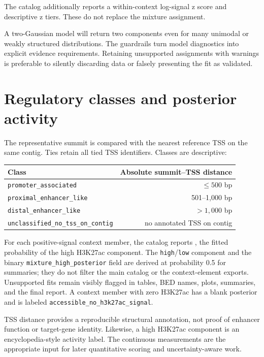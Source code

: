 \documentclass[11pt]{article}
\newcommand{\filep}[1]{\path{#1}}
\begin{document}
The catalog additionally reports a within-context log-signal z score and
descriptive z tiers.  These do not replace the mixture assignment.

A two-Gaussian model will return two components even for many unimodal or
weakly structured distributions.  The guardrails turn model diagnostics into
explicit evidence requirements.  Retaining unsupported assignments with
warnings is preferable to silently discarding data or falsely presenting the
fit as validated.

\section{Regulatory classes and posterior activity}

The representative summit is compared with the nearest reference TSS on the
same contig.  Ties retain all tied TSS identifiers.  Classes are descriptive:

\begin{center}
\begin{tabular}{lr}
\toprule
Class & Absolute summit--TSS distance \\
\midrule
\texttt{promoter\_associated} & \(\leq500\) bp \\
\texttt{proximal\_enhancer\_like} & 501--1,000 bp \\
\texttt{distal\_enhancer\_like} & \(>1{,}000\) bp \\
\texttt{unclassified\_no\_tss\_on\_contig} & no annotated TSS on contig \\
\bottomrule
\end{tabular}
\end{center}

For each positive-signal context member, the catalog reports
\filep{mixture_high_posterior_probability}, the fitted probability of the
high H3K27ac component.  The \texttt{high}/\texttt{low} component and the
binary \texttt{mixture\_high\_posterior} field are derived at probability 0.5
for summaries; they do not filter the main catalog or the context-element
exports.  Unsupported fits remain visibly flagged in tables, BED names,
plots, summaries, and the final report.  A context member with zero H3K27ac
has a blank posterior and is labeled
\texttt{accessible\_no\_h3k27ac\_signal}.

TSS distance provides a reproducible structural annotation, not proof of
enhancer function or target-gene identity.  Likewise, a high H3K27ac component
is an encyclopedia-style activity label.  The continuous measurements are the
appropriate input for later quantitative scoring and uncertainty-aware work.
\end{document}

